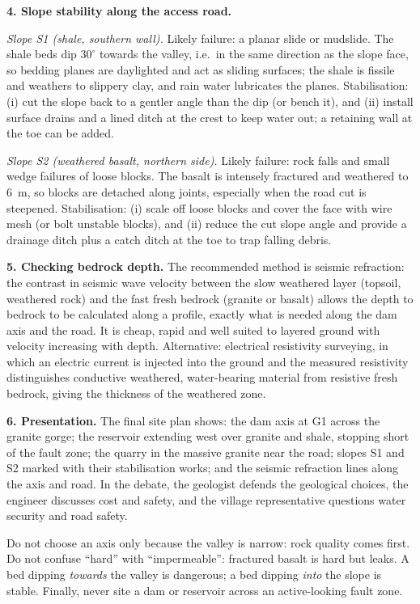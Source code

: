 \documentclass[11pt]{article}
\newcommand{\cle}[1]{{\popxbold\color{popdark}#1}}
\begin{document}
\textbf{4. Slope stability along the access road.}

\emph{Slope S1 (shale, southern wall).} Likely failure: a \cle{planar slide} or mudslide. The shale beds dip $30^{\circ}$ towards the valley, i.e.\ in the same direction as the slope face, so bedding planes are daylighted and act as sliding surfaces; the shale is fissile and weathers to slippery clay, and rain water lubricates the planes. Stabilisation: (i) cut the slope back to a gentler angle than the dip (or bench it), and (ii) install surface drains and a lined ditch at the crest to keep water out; a retaining wall at the toe can be added.

\emph{Slope S2 (weathered basalt, northern side).} Likely failure: \cle{rock falls} and small wedge failures of loose blocks. The basalt is intensely fractured and weathered to \SI{6}{m}, so blocks are detached along joints, especially when the road cut is steepened. Stabilisation: (i) scale off loose blocks and cover the face with wire mesh (or bolt unstable blocks), and (ii) reduce the cut slope angle and provide a drainage ditch plus a catch ditch at the toe to trap falling debris.

\textbf{5. Checking bedrock depth.} The recommended method is \cle{seismic refraction}: the contrast in seismic wave velocity between the slow weathered layer (topsoil, weathered rock) and the fast fresh bedrock (granite or basalt) allows the depth to bedrock to be calculated along a profile, exactly what is needed along the dam axis and the road. It is cheap, rapid and well suited to layered ground with velocity increasing with depth. Alternative: \cle{electrical resistivity surveying}, in which an electric current is injected into the ground and the measured resistivity distinguishes conductive weathered, water-bearing material from resistive fresh bedrock, giving the thickness of the weathered zone.

\textbf{6. Presentation.} The final site plan shows: the dam axis at G1 across the granite gorge; the reservoir extending west over granite and shale, stopping short of the fault zone; the quarry in the massive granite near the road; slopes S1 and S2 marked with their stabilisation works; and the seismic refraction lines along the axis and road. In the debate, the geologist defends the geological choices, the engineer discusses cost and safety, and the village representative questions water security and road safety.

\begin{attention}
Do not choose an axis only because the valley is narrow: rock quality comes first. Do not confuse ``hard'' with ``impermeable'': fractured basalt is hard but leaks. A bed dipping \emph{towards} the valley is dangerous; a bed dipping \emph{into} the slope is stable. Finally, never site a dam or reservoir across an active-looking fault zone.
\end{attention}
\end{document}
